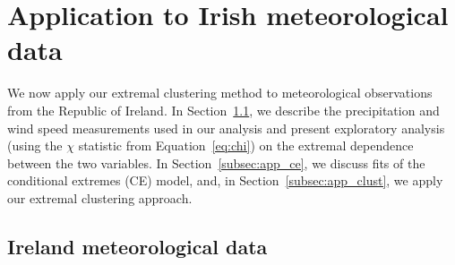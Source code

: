 \documentclass[12pt,compact]{article}
\begin{document}
\section{Application to Irish meteorological data}
\label{sec:application}
We now apply our extremal clustering method to meteorological observations from the Republic of Ireland. 
In Section~\ref{subsec:app_data}, we describe the precipitation and wind speed measurements used in our analysis and present exploratory analysis (using the $\chi$ statistic from Equation~\eqref{eq:chi}) on the extremal dependence between the two variables. 
In Section~\ref{subsec:app_ce}, we discuss fits of the conditional extremes (CE) model, and, in Section~\ref{subsec:app_clust}, we apply our extremal clustering approach. %

\subsection{Ireland meteorological data}
\label{subsec:app_data}
\end{document}
